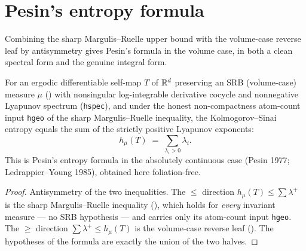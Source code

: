 \section{Pesin's entropy formula}

Combining the sharp Margulis--Ruelle upper bound with the volume-case reverse leaf by
antisymmetry gives Pesin's formula in the volume case, in both a clean spectral form and the
genuine integral form.

\begin{theorem}\label{pesin_entropy_formula_spectral}
  \leanok
  For an ergodic differentiable self-map \(T\) of \(\mathbb{R}^d\) preserving an SRB (volume-case) measure
  \(\mu\) () with nonsingular log-integrable derivative cocycle and nonnegative
  Lyapunov spectrum (\texttt{hspec}), and under the honest non-compactness atom-count input
  \texttt{hgeo} of the sharp Margulis--Ruelle inequality, the Kolmogorov--Sinai entropy equals the
  sum of the strictly positive Lyapunov exponents:
  \[
    h_\mu(T) \;=\; \sum_{\lambda_i>0}\lambda_i .
  \]
  This is Pesin's entropy formula in the absolutely continuous case (Pesin 1977;
  Ledrappier--Young 1985), obtained here foliation-free.
\end{theorem}
\begin{proof}\leanok
  Antisymmetry of the two inequalities. The \(\le\) direction
  \(h_\mu(T)\le\sum\lambda^{+}\) is the sharp Margulis--Ruelle inequality
  (), which holds for \emph{every} invariant measure --- no SRB
  hypothesis --- and carries only its atom-count input \texttt{hgeo}. The \(\ge\) direction
  \(\sum\lambda^{+}\le h_\mu(T)\) is the volume-case reverse leaf
  (). The hypotheses of the formula are exactly the union of
  the two halves.
\end{proof}

